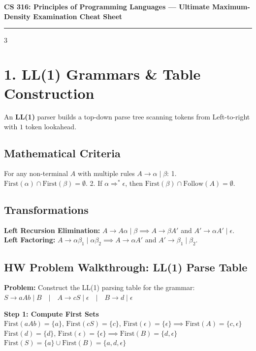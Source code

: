 \documentclass[8.5pt,landscape,a4paper]{article}
\begin{document}
\begin{center}
    {\small \textbf{\color{primary}CS 316: Principles of Programming Languages --- Ultimate Maximum-Density Examination Cheat Sheet}} \\
    \vskip 0.5pt
    \rule{\textwidth}{0.4pt}
\end{center}

\begin{multicols*}{3}

\section{1. LL(1) Grammars \& Table Construction}
An \textbf{LL(1)} parser builds a top-down parse tree scanning tokens from Left-to-right with $1$ token lookahead.

\subsection{Mathematical Criteria}
For any non-terminal $A$ with multiple rules $A \rightarrow \alpha \mid \beta$:
1. $\text{First}(\alpha) \cap \text{First}(\beta) = \emptyset$.
2. If $\alpha \Rightarrow^* \epsilon$, then $\text{First}(\beta) \cap \text{Follow}(A) = \emptyset$.

\subsection{Transformations}
\textbf{Left Recursion Elimination:} $A \rightarrow A\alpha \mid \beta \implies A \rightarrow \beta A'$ and $A' \rightarrow \alpha A' \mid \epsilon$.\\
\textbf{Left Factoring:} $A \rightarrow \alpha\beta_1 \mid \alpha\beta_2 \implies A \rightarrow \alpha A'$ and $A' \rightarrow \beta_1 \mid \beta_2$.

\subsection{HW Problem Walkthrough: LL(1) Parse Table}
\textbf{Problem:} Construct the LL(1) parsing table for the grammar:\\
$S \rightarrow a A b \mid B \quad | \quad A \rightarrow c S \mid \epsilon \quad | \quad B \rightarrow d \mid \epsilon$

\textbf{Step 1: Compute First Sets}\\
$\text{First}(aAb) = \{a\}$, $\text{First}(cS) = \{c\}$, $\text{First}(\epsilon) = \{\epsilon\} \implies \text{First}(A) = \{c, \epsilon\}$\\
$\text{First}(d) = \{d\}$, $\text{First}(\epsilon) = \{\epsilon\} \implies \text{First}(B) = \{d, \epsilon\}$\\
$\text{First}(S) = \{a\} \cup \text{First}(B) = \{a, d, \epsilon\}$


\end{multicols*}
\end{document}
